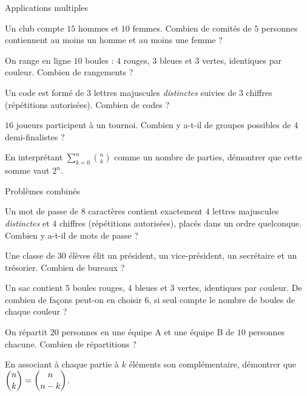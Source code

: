 \begin{exercice}[2]{Applications multiples}
\begin{questions}
  \item Un club compte $15$ hommes et $10$ femmes. Combien de comités de $5$ personnes contiennent au moins un homme et au moins une femme ?
  \item On range en ligne $10$ boules : $4$ rouges, $3$ bleues et $3$ vertes, identiques par couleur. Combien de rangements ?
  \item Un code est formé de $3$ lettres majuscules \emph{distinctes} suivies de $3$ chiffres (répétitions autorisées). Combien de codes ?
  \item $16$ joueurs participent à un tournoi. Combien y a-t-il de groupes possibles de $4$ demi-finalistes ?
  \item En interprétant $\displaystyle\sum_{k=0}^{n}\binom nk$ comme un nombre de parties, démontrer que cette somme vaut $2^{n}$.
\end{questions}
\end{exercice}


\begin{exercice}[3]{Problèmes combinés}
\begin{questions}
  \item Un mot de passe de $8$ caractères contient exactement $4$ lettres majuscules \emph{distinctes} et $4$ chiffres (répétitions
    autorisées), placés dans un ordre quelconque. Combien y a-t-il de mots de passe ?
  \item Une classe de $30$ élèves élit un président, un vice-président, un secrétaire et un trésorier. Combien de bureaux ?
  \item Un sac contient $5$ boules rouges, $4$ bleues et $3$ vertes, identiques par couleur. De combien de façons peut-on en
    choisir $6$, si seul compte le nombre de boules de chaque couleur ?
  \item On répartit $20$ personnes en une équipe A et une équipe B de $10$ personnes chacune. Combien de répartitions ?
  \item En associant à chaque partie à $k$ éléments son complémentaire, démontrer que $\dbinom nk=\dbinom n{n-k}$.
\end{questions}
\end{exercice}

